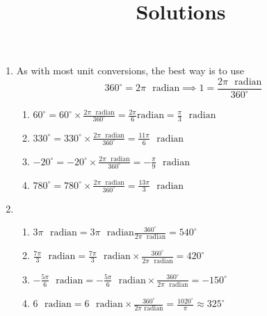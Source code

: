 \documentclass{article}
\title{\commonPSTitleZeroZeroD\ Solutions}
\author{\commonAuthor}
\date{\commonDateZeroZeroD}
\newcommand{\radian}{\mathrm{radian}}
\newcommand{\ds}{\displaystyle}
\begin{document}
\maketitle
\begin{enumerate} 
\item %
  As with most unit conversions, the best way is to use 
  \begin{equation*}
    360^{\circ} = \mbox{\(2\pi\) \(\radian\)} \implies 1
    = \frac{\mbox{\(2\pi\) \(\radian\)}}{360^{\circ}}
  \end{equation*}
  \begin{enumerate}
  \item %
    $\ds 60^{\circ} = 60^{\circ}\times \frac{\mbox{$2\pi$ $\radian$}}{360^{\circ}}
    = \frac{2\pi}{6} \radian = \mbox{$\ds \frac{\pi}{3}$ $\radian$}$
  \item %
    $\ds 330^{\circ} = 330^{\circ} \times \frac{\mbox{$2\pi$ $\radian$}}{360^{\circ}}
    = \mbox{$\ds \frac{11\pi}{6}$ $\radian$}$
  \item %
    $\ds -20^{\circ} = -20^{\circ} \times \frac{\mbox{$2\pi$ $\radian$}}{360^{\circ}}
    = \mbox{$\ds -\frac{\pi}{9}$ $\radian$}$
  \item %
    $\ds 780^{\circ} = 780^{\circ} \times \frac{\mbox{$2\pi$ $\radian$}}{360^{\circ}}
    = \mbox{$\ds \frac{13\pi}{3}$ $\radian$}$
  \end{enumerate}
\item %
  \begin{enumerate}
  \item %
    $\ds \mbox{$3\pi$ $\radian$} 
    = \mbox{$3\pi$ $\radian$} \frac{360^{\circ}}{\mbox{$2\pi$ $\radian$}} 
    = 540^{\circ}$
  \item %
    $\ds \mbox{$\ds \frac{7\pi}{3}$ $\radian$} 
    = \mbox{$\ds \frac{7\pi}{3}$ $\radian$} \times
    \frac{360^{\circ}}{\mbox{$2\pi$ $\radian$}} = 420^{\circ}$
  \item %
    $\ds \mbox{$\ds -\frac{5\pi}{6}$ $\radian$} 
    = \mbox{$\ds -\frac{5\pi}{6}$ $\radian$} \times
    \frac{360^{\circ}}{\mbox{$2\pi$ $\radian$}} = -150^{\circ}$
  \item %
    $\ds \mbox{$6$ $\radian$} 
    = \mbox{$6$ $\radian$} \times \frac{360^{\circ}}{\mbox{$2\pi$
        $\radian$}} 
    = \frac{1020^{\circ}}{\pi} \approx 325^{\circ}$

\end{enumerate}
\end{enumerate}
\end{document}
